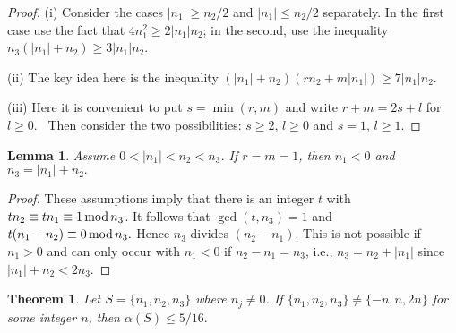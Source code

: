 \documentclass{amsart}
\newtheorem{theorem}{Theorem}
\newtheorem{lemma}{Lemma}
\begin{document}
\begin{proof}
(i) Consider the cases $\left\vert n_{1}\right\vert \geq n_{2}/2$ and $\left\vert n_{1}\right\vert \leq n_{2}/2$ separately. In the first case use
the fact that $4n_{1}^{2}\geq 2\left\vert n_{1}\right\vert n_{2}$; in the
second, use the inequality $n_{3}(\left\vert n_{1}\right\vert +n_{2})\geq
3\left\vert n_{1}\right\vert n_{2}$.

(ii) The key idea here is the inequality $(\left\vert n_{1}\right\vert
+n_{2})\left( rn_{2}+m\left\vert n_{1}\right\vert \right) \geq 7\left\vert
n_{1}\right\vert n_{2}$.

(iii) Here it is convenient to put $s=\min (r,m)$ and write $r+m=2s+l$ for $l\geq 0$. \ Then consider the two possibilities: $s\geq 2$, $l\geq 0$ and $s=1$, $l\geq 1$.
\end{proof}

\begin{lemma}
\label{L4}Assume $0<\left\vert n_{1}\right\vert <n_{2}<n_{3}$. If $r=m=1$,
then $n_{1}<0$ and $n_{3}=\left\vert n_{1}\right\vert +n_{2}.$
\end{lemma}

\begin{proof}
These assumptions imply that there is an integer $t$ with $tn_{2}\equiv
tn_{1}\equiv 1\text{\thinspace mod\thinspace }n_{3}$. It follows that $\gcd
(t,n_{3})=1$ and $t(n_{1}-n_{2})\equiv 0\text{\thinspace mod\thinspace }n_{3}.$ Hence $n_{3}$ divides $(n_{2}-n_{1})$. This is not possible if $n_{1}>0$ and can only occur with $n_{1}<0$ if $n_{2}-n_{1}=n_{3}$, i.e., $n_{3}=n_{2}+\left\vert n_{1}\right\vert $ since $\left\vert n_{1}\right\vert
+n_{2}<2n_{3}$.
\end{proof}

\begin{theorem}\label{T:fivesixteenths}
Let $S=\{n_{1},n_{2},n_{3}\}$ where $n_{j}\neq 0$. If $\{n_{1},n_{2},n_{3}\}\neq \{-n,n,2n\}$ for some integer $n$, then $\alpha (S)\leq 5/16.$
\end{theorem}
\end{document}
